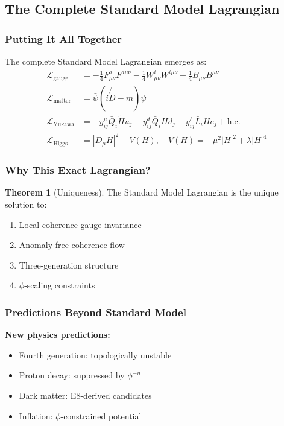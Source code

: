 \documentclass[11pt]{article}
\theoremstyle{definition}
\newtheorem{theorem}{Theorem}[section]
\newcommand{\goldenratio}{\phi}
\begin{document}
\subsection{The Complete Standard Model Lagrangian}

\subsubsection{Putting It All Together}

The complete Standard Model Lagrangian emerges as:
\begin{align}
\mathcal{L}_{\text{gauge}} &= -\frac{1}{4}F_{\mu\nu}^a F^{a\mu\nu} - \frac{1}{4}W_{\mu\nu}^i W^{i\mu\nu} - \frac{1}{4}B_{\mu\nu} B^{\mu\nu} \\
\mathcal{L}_{\text{matter}} &= \bar{\psi}(i\not{D} - m)\psi \\
\mathcal{L}_{\text{Yukawa}} &= -y_{ij}^u \bar{Q}_i \tilde{H} u_j - y_{ij}^d \bar{Q}_i H d_j - y_{ij}^\ell \bar{L}_i H e_j + \text{h.c.} \\
\mathcal{L}_{\text{Higgs}} &= |D_\mu H|^2 - V(H), \quad V(H) = -\mu^2|H|^2 + \lambda|H|^4
\end{align}

\subsubsection{Why This Exact Lagrangian?}

\begin{theorem}[Uniqueness]
The Standard Model Lagrangian is the unique solution to:
\begin{enumerate}
\item Local coherence gauge invariance
\item Anomaly-free coherence flow
\item Three-generation structure
\item $\goldenratio$-scaling constraints
\end{enumerate}
\end{theorem}

\subsubsection{Predictions Beyond Standard Model}

\textbf{New physics predictions:}
\begin{itemize}
\item Fourth generation: topologically unstable
\item Proton decay: suppressed by $\goldenratio^{-n}$
\item Dark matter: E8-derived candidates
\item Inflation: $\goldenratio$-constrained potential
\end{itemize}
\end{document}
